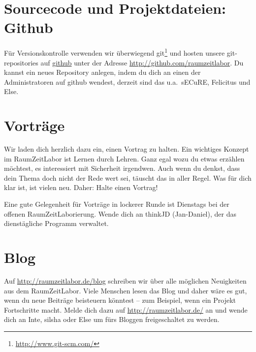\documentclass[12pt, DIV16, a4paper]{scrartcl}
\begin{document}
\section*{Sourcecode und Projektdateien: Github}

Für Versionskontrolle verwenden wir überwiegend
git\footnote{\url{http://www.git-scm.com/}} und hosten unsere git-repositories
auf \href{http://github.com/}{github} unter der Adresse
\url{http://github.com/raumzeitlabor}. Du kannst ein neues Repository anlegen,
indem du dich an einen der Administratoren auf github wendest, derzeit sind das
u.a.\ sECuRE, Felicitus und Else.

\section*{Vorträge}

Wir laden dich herzlich dazu ein, einen Vortrag zu halten. Ein wichtiges
Konzept im RaumZeitLabor ist Lernen durch Lehren. Ganz egal wozu du etwas
erzählen möchtest, es interessiert mit Sicherheit irgendwen. Auch wenn du
denkst, dass dein Thema doch nicht der Rede wert sei, täuscht das in aller
Regel. Was für dich klar ist, ist vielen neu. Daher: Halte einen Vortrag!
\np

Eine gute Gelegenheit für Vorträge in lockerer Runde ist Dienstags bei der
offenen RaumZeitLaborierung. Wende dich an thinkJD (Jan-Daniel), der das
dienstägliche Programm verwaltet.

\section*{Blog}

Auf \url{http://raumzeitlabor.de/blog} schreiben wir über alle möglichen
Neuigkeiten aus dem RaumZeitLabor. Viele Menschen lesen das Blog und daher wäre
es gut, wenn du neue Beiträge beisteuern könntest -- zum Beispiel, wenn ein
Projekt Fortschritte macht. Melde dich dazu auf \url{http://raumzeitlabor.de/}
an und wende dich an Inte, silsha oder Else um fürs Bloggen freigeschaltet zu
werden.
\end{document}
